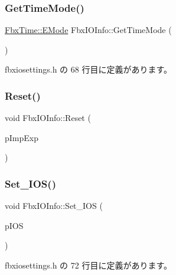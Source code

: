 \subsubsection{\texorpdfstring{Get\+Time\+Mode()}{GetTimeMode()}}
{\footnotesize\ttfamily \hyperlink{class_fbx_time_acc529b00a0e8d4c3da3702449ca93031}{Fbx\+Time\+::\+E\+Mode} Fbx\+I\+O\+Info\+::\+Get\+Time\+Mode (\begin{DoxyParamCaption}{ }\end{DoxyParamCaption})\hspace{0.3cm}{\ttfamily [inline]}}



 fbxiosettings.\+h の 68 行目に定義があります。

\mbox{\label{class_fbx_i_o_info_a9fbc4993a076a3f91fdda9a29014dff4}} 
\subsubsection{\texorpdfstring{Reset()}{Reset()}}
{\footnotesize\ttfamily void Fbx\+I\+O\+Info\+::\+Reset (\begin{DoxyParamCaption}\item[{\hyperlink{class_fbx_i_o_info_a0c167beca637e7a1f723942694d61c75}{E\+Imp\+Exp}}]{p\+Imp\+Exp }\end{DoxyParamCaption})}

\mbox{\label{class_fbx_i_o_info_aa6b34fce0426b8f61f05262168c3004e}} 
\subsubsection{\texorpdfstring{Set\+\_\+\+I\+O\+S()}{Set\_IOS()}}
{\footnotesize\ttfamily void Fbx\+I\+O\+Info\+::\+Set\+\_\+\+I\+OS (\begin{DoxyParamCaption}\item[{\hyperlink{class_fbx_i_o_settings}{Fbx\+I\+O\+Settings} $\ast$}]{p\+I\+OS }\end{DoxyParamCaption})\hspace{0.3cm}{\ttfamily [inline]}}



 fbxiosettings.\+h の 72 行目に定義があります。

